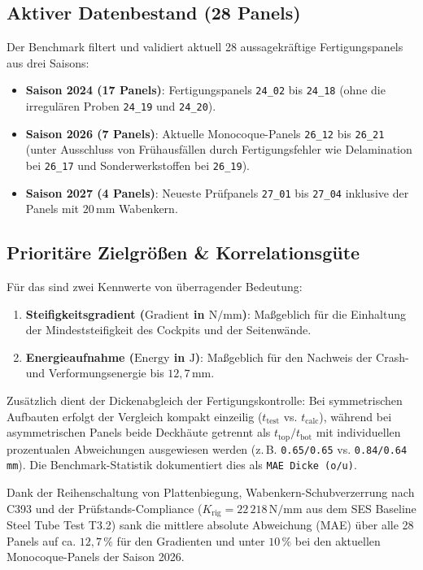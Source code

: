 \subsection*{Aktiver Datenbestand (28 Panels)}
Der Benchmark filtert und validiert aktuell 28 aussagekräftige Fertigungspanels aus drei Saisons:
\begin{itemize}
    \item \textbf{Saison 2024 (17 Panels)}: Fertigungspanels \texttt{24\_02} bis \texttt{24\_18} (ohne die irregulären Proben \texttt{24\_19} und \texttt{24\_20}).
    \item \textbf{Saison 2026 (7 Panels)}: Aktuelle Monocoque-Panels \texttt{26\_12} bis \texttt{26\_21} (unter Ausschluss von Frühausfällen durch Fertigungsfehler wie Delamination bei \texttt{26\_17} und Sonderwerkstoffen bei \texttt{26\_19}).
    \item \textbf{Saison 2027 (4 Panels)}: Neueste Prüfpanels \texttt{27\_01} bis \texttt{27\_04} inklusive der Panels mit $20\,\text{mm}$ Wabenkern.
\end{itemize}

\subsection*{Prioritäre Zielgrößen \& Korrelationsgüte}
Für das  sind zwei Kennwerte von überragender Bedeutung:
\begin{enumerate}
    \item \textbf{Steifigkeitsgradient ($\text{Gradient}$ in $\text{N/mm}$)}: Maßgeblich für die Einhaltung der Mindeststeifigkeit des Cockpits und der Seitenwände.
    \item \textbf{Energieaufnahme ($\text{Energy}$ in $\text{J}$)}: Maßgeblich für den Nachweis der Crash- und Verformungsenergie bis $12{,}7\,\text{mm}$.
\end{enumerate}
Zusätzlich dient der Dickenabgleich der Fertigungskontrolle: Bei symmetrischen Aufbauten erfolgt der Vergleich kompakt einzeilig ($t_{\text{test}}$ vs. $t_{\text{calc}}$), während bei asymmetrischen Panels beide Deckhäute getrennt als $t_{\text{top}}/t_{\text{bot}}$ mit individuellen prozentualen Abweichungen ausgewiesen werden (z.\,B. \texttt{0.65/0.65} vs. \texttt{0.84/0.64\,mm}). Die Benchmark-Statistik dokumentiert dies als \texttt{MAE Dicke (o/u)}.

Dank der Reihenschaltung von Plattenbiegung, Wabenkern-Schubverzerrung nach  C393 und der Prüfstands-Compliance ($K_{\text{rig}} = 22\,218\,\text{N/mm}$ aus dem SES Baseline Steel Tube Test T3.2) sank die mittlere absolute Abweichung (MAE) über alle 28 Panels auf ca. $12{,}7\,\%$ für den Gradienten und unter $10\,\%$ bei den aktuellen Monocoque-Panels der Saison 2026.

